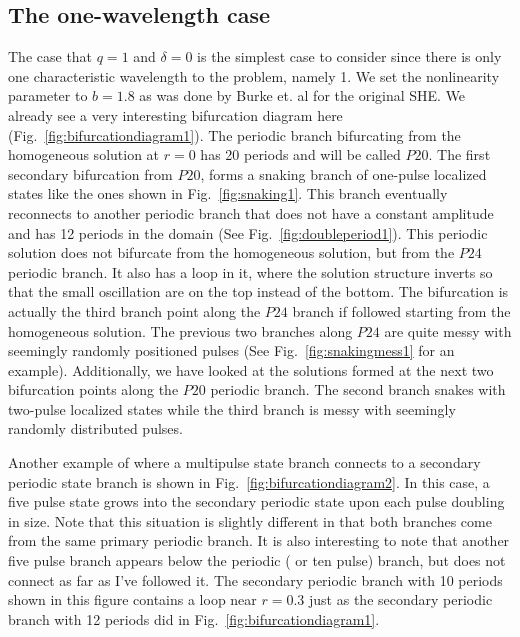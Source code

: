 \documentclass[../main/WavelengthCompetition.tex]{subfiles}
\begin{document}
\subsection{The one-wavelength case}
The case that $q=1$ and $\delta=0$ is the simplest case to consider since there is only one characteristic wavelength to the problem, namely 1.  We set the nonlinearity parameter to $b=1.8$ as was done by Burke et. al for the original SHE.    We already see a very interesting bifurcation diagram here (Fig.~\ref{fig:bifurcationdiagram1}).
\FIGbifurcationdiagramA
The periodic branch bifurcating from the homogeneous solution at $r=0$ has 20 periods and will be called $P20$.  The first secondary bifurcation from $P20$, forms a snaking branch of one-pulse localized states like the ones shown in Fig.~\ref{fig:snaking1}.
\FIGsnakingA
This branch eventually reconnects to another periodic branch that does not have a constant amplitude and has 12 periods in the domain (See Fig.~\ref{fig:doubleperiod1}).
\FIGdoubleperiod
This periodic solution does not bifurcate from the homogeneous solution, but from the $P24$ periodic branch.  It also has a loop in it, where the solution structure inverts so that the small oscillation are on the top instead of the bottom. The bifurcation is  actually the third branch point along the $P24$ branch if followed starting from the homogeneous solution.  The previous two branches along $P24$ are quite messy with seemingly randomly positioned pulses (See Fig.~\ref{fig:snakingmess1} for an example).
\FIGsnakingmess  
Additionally, we have looked at the solutions formed at the next two bifurcation points along the $P20$ periodic branch.  The second branch snakes with two-pulse localized states while the third branch is messy with seemingly randomly distributed pulses.

Another example of where a  multipulse state branch connects to a secondary periodic state branch is shown in Fig.~\ref{fig:bifurcationdiagram2}.  In this case, a five pulse state grows into the secondary periodic state upon each pulse doubling in size.  Note that this situation is slightly different in that both branches come from the same primary periodic branch.  It is also interesting to note that another five pulse branch appears below the periodic ( or ten pulse) branch, but does not connect as far as I've followed it. The secondary periodic branch with 10 periods shown in this figure contains a loop near $r=0.3$ just as the secondary periodic branch with 12 periods did in Fig.~\ref{fig:bifurcationdiagram1}.  
\FIGbifurcationdiagramB
\end{document}
